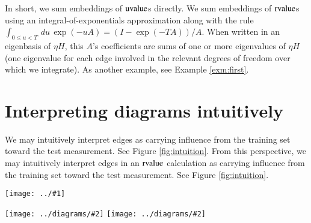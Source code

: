 \documentclass[openany, notitlepage, justified]{tufte-book}
\theoremstyle{plain}
\theoremstyle{definition}
\newcommand{\uvalue}{\text{\textnormal{uvalue}}}
\newcommand{\rvalue}{\text{\textnormal{rvalue}}}
\newcommand{\plotmooh}[3]{\texttt{[image: ../\#1]}}
\newcommand{\dmoo}[2]{\texttt{[image: ../diagrams/\#2]}}
\newcommand{\sizeddia}[2]{
    \begin{gathered}
        \texttt{[image: ../diagrams/\#1.png]}
    \end{gathered}
}
\newcommand{\sdia}[1]{\protect \sizeddia{#1}{0.10}}
\begin{document}
        In short, we sum embeddings of $\uvalue$s directly.
        We sum embeddings of $\rvalue$s using an integral-of-exponentials
        approximation along with the rule 
            $\int_{0\leq u<T} \, du \, \exp(-u A) = (I - \exp(-T A))/A$. 
        When written in an eigenbasis of $\eta H$, this $A$'s coefficients are
        sums of one or more eigenvalues of $\eta H$ (one eigenvalue for each
        edge involved in the relevant degrees of freedom over which we
        integrate).  As another example, see Example \ref{exm:first}.

    \section{Interpreting diagrams intuitively}                  \label{appendix:interpret-diagrams}

        We may intuitively interpret edges as carrying influence from the
        training set toward the test measurement.  See Figure
        \ref{fig:intuition}.  From this perspective, we may intuitively
        interpret edges in an $\rvalue$ calculation as carrying influence from
        the training set toward the test measurement.  See Figure
        \ref{fig:intuition}.

        \begin{marginfigure} 
            \centering  
            \plotmooh{diagrams/spacetime-f}{}{0.26\columnwidth}
            \caption{
                \textbf{Edges carry information}.
                Embedding of a $4$-edged diagram.
            }
            \label{fig:intuition}
        \end{marginfigure}


        \begin{marginfigure} 
            \centering  
            \dmoo{3cm}{spacetime-g}
            \dmoo{3cm}{spacetime-h}
            \caption{
                \textbf{Resummation propagates information, damped by
                curvature}.  Each resummed valuerepresents many un-resummed
                values, each modulated by the Hessian ($\sdia{MOOc(0)(0-0)}$)
                in a different way.
                \textbf{Left}: Here is one of many un-resummed terms captured by
                a single resummed embedding for $\sdia{c(0-1)(01)}$.
                \textbf{Left}: each resummed value represents many un-resummed
                values.  Here is one of many un-resummed terms captured by
                a single resummed embedding for $\sdia{c(01-2)(02-12)}$.
            }
            \label{fig:intuition}
        \end{marginfigure}
\end{document}
